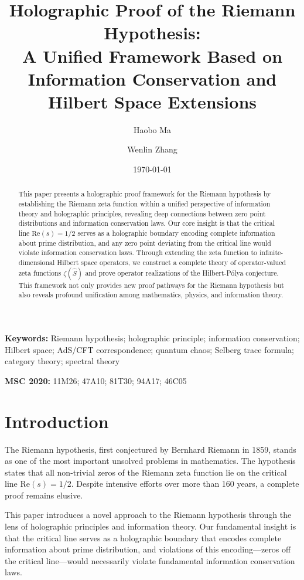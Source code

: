 \documentclass[12pt]{article}
\title{Holographic Proof of the Riemann Hypothesis: \\
A Unified Framework Based on Information Conservation and Hilbert Space Extensions}
\author{Haobo Ma \and Wenlin Zhang}
\date{\today}
\begin{document}
\maketitle

\begin{abstract}
This paper presents a holographic proof framework for the Riemann hypothesis by establishing the Riemann zeta function within a unified perspective of information theory and holographic principles, revealing deep connections between zero point distributions and information conservation laws. Our core insight is that the critical line $\text{Re}(s)=1/2$ serves as a holographic boundary encoding complete information about prime distribution, and any zero point deviating from the critical line would violate information conservation laws. Through extending the zeta function to infinite-dimensional Hilbert space operators, we construct a complete theory of operator-valued zeta functions $\zeta(\hat{S})$ and prove operator realizations of the Hilbert-Pólya conjecture. This framework not only provides new proof pathways for the Riemann hypothesis but also reveals profound unification among mathematics, physics, and information theory.
\end{abstract}

\textbf{Keywords:} Riemann hypothesis; holographic principle; information conservation; Hilbert space; AdS/CFT correspondence; quantum chaos; Selberg trace formula; category theory; spectral theory

\textbf{MSC 2020:} 11M26; 47A10; 81T30; 94A17; 46C05

\section{Introduction}

The Riemann hypothesis, first conjectured by Bernhard Riemann in 1859, stands as one of the most important unsolved problems in mathematics. The hypothesis states that all non-trivial zeros of the Riemann zeta function lie on the critical line $\text{Re}(s) = 1/2$. Despite intensive efforts over more than 160 years, a complete proof remains elusive.

This paper introduces a novel approach to the Riemann hypothesis through the lens of holographic principles and information theory. Our fundamental insight is that the critical line serves as a holographic boundary that encodes complete information about prime distribution, and violations of this encoding—zeros off the critical line—would necessarily violate fundamental information conservation laws.
\end{document}
